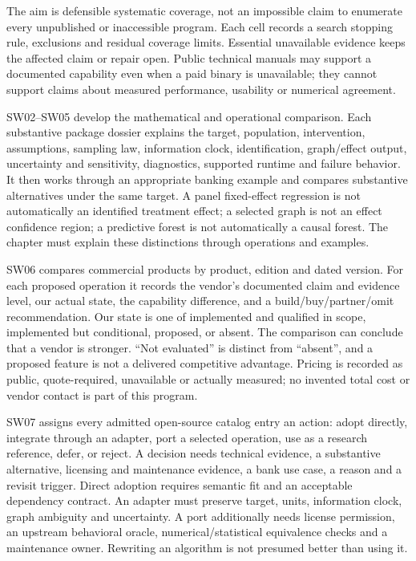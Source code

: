 \documentclass[
  11pt,
  a4paper,
]{article}
\begin{document}
The aim is defensible systematic coverage, not an impossible claim to
enumerate every unpublished or inaccessible program. Each cell records a
search stopping rule, exclusions and residual coverage limits. Essential
unavailable evidence keeps the affected claim or repair open. Public
technical manuals may support a documented capability even when a paid
binary is unavailable; they cannot support claims about measured
performance, usability or numerical agreement.

SW02--SW05 develop the mathematical and operational comparison. Each
substantive package dossier explains the target, population,
intervention, assumptions, sampling law, information clock,
identification, graph/effect output, uncertainty and sensitivity,
diagnostics, supported runtime and failure behavior. It then works
through an appropriate banking example and compares substantive
alternatives under the same target. A panel fixed-effect regression is
not automatically an identified treatment effect; a selected graph is
not an effect confidence region; a predictive forest is not
automatically a causal forest. The chapter must explain these
distinctions through operations and examples.

SW06 compares commercial products by product, edition and dated version.
For each proposed operation it records the vendor's documented claim and
evidence level, our actual state, the capability difference, and a
build/buy/partner/omit recommendation. Our state is one of implemented
and qualified in scope, implemented but conditional, proposed, or
absent. The comparison can conclude that a vendor is stronger. ``Not
evaluated'' is distinct from ``absent'', and a proposed feature is not a
delivered competitive advantage. Pricing is recorded as public,
quote-required, unavailable or actually measured; no invented total cost
or vendor contact is part of this program.

SW07 assigns every admitted open-source catalog entry an action: adopt
directly, integrate through an adapter, port a selected operation, use
as a research reference, defer, or reject. A decision needs technical
evidence, a substantive alternative, licensing and maintenance evidence,
a bank use case, a reason and a revisit trigger. Direct adoption
requires semantic fit and an acceptable dependency contract. An adapter
must preserve target, units, information clock, graph ambiguity and
uncertainty. A port additionally needs license permission, an upstream
behavioral oracle, numerical/statistical equivalence checks and a
maintenance owner. Rewriting an algorithm is not presumed better than
using it.
\end{document}
